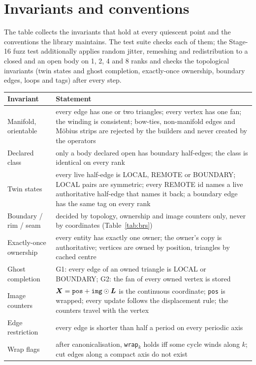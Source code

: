 \chapter{Invariants and conventions}
\label{ch:invariants}

The table collects the invariants that hold at every quiescent point and the conventions the
library maintains. The test suite checks each of them; the Stage-16 fuzz test additionally
applies random jitter, remeshing and redistribution to a closed and an open body on 1, 2, 4 and 8
ranks and checks the topological invariants (twin states and ghost completion, exactly-once
ownership, boundary edges, loops and tags) after every step.

\begin{center}\small
\begin{longtable}{@{}p{}p{}@{}}
\toprule
Invariant & Statement \\
\midrule
\endhead
Manifold, orientable & every edge has one or two triangles; every vertex has one fan; the winding is consistent; bow-ties, non-manifold edges and M\"obius strips are rejected by the builders and never created by the operators \\
Declared class & only a body declared open has boundary half-edges; the class is identical on every rank \\
Twin states & every live half-edge is LOCAL, REMOTE or BOUNDARY; LOCAL pairs are symmetric; every REMOTE id names a live authoritative half-edge that names it back; a boundary edge has the same tag on every rank \\
Boundary / rim / seam & decided by topology, ownership and image counters only, never by coordinates (Table~\ref{tab:brs}) \\
Exactly-once ownership & every entity has exactly one owner; the owner's copy is authoritative; vertices are owned by position, triangles by cached centre \\
Ghost completion & G1: every edge of an owned triangle is LOCAL or BOUNDARY; G2: the fan of every owned vertex is stored \\
Image counters & $\boldsymbol{X}=\texttt{pos}+\texttt{img}\odot\boldsymbol{L}$ is the continuous coordinate; \texttt{pos} is wrapped; every update follows the displacement rule; the counters travel with the vertex \\
Edge restriction & every edge is shorter than half a period on every periodic axis \\
Wrap flags & after canonicalisation, \texttt{wrap}$_k$ holds iff some cycle winds along $k$; cut edges along a compact axis do not exist \\

\end{longtable}
\end{center}
